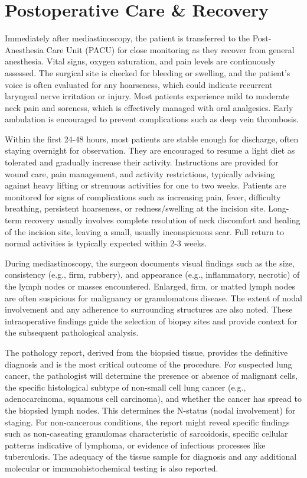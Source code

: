 \section*{Postoperative Care \& Recovery}
Immediately after mediastinoscopy, the patient is transferred to the Post-Anesthesia Care Unit (PACU) for close monitoring as they recover from general anesthesia. Vital signs, oxygen saturation, and pain levels are continuously assessed. The surgical site is checked for bleeding or swelling, and the patient's voice is often evaluated for any hoarseness, which could indicate recurrent laryngeal nerve irritation or injury. Most patients experience mild to moderate neck pain and soreness, which is effectively managed with oral analgesics. Early ambulation is encouraged to prevent complications such as deep vein thrombosis.

Within the first 24-48 hours, most patients are stable enough for discharge, often staying overnight for observation. They are encouraged to resume a light diet as tolerated and gradually increase their activity. Instructions are provided for wound care, pain management, and activity restrictions, typically advising against heavy lifting or strenuous activities for one to two weeks. Patients are monitored for signs of complications such as increasing pain, fever, difficulty breathing, persistent hoarseness, or redness/swelling at the incision site. Long-term recovery usually involves complete resolution of neck discomfort and healing of the incision site, leaving a small, usually inconspicuous scar. Full return to normal activities is typically expected within 2-3 weeks.

During mediastinoscopy, the surgeon documents visual findings such as the size, consistency (e.g., firm, rubbery), and appearance (e.g., inflammatory, necrotic) of the lymph nodes or masses encountered. Enlarged, firm, or matted lymph nodes are often suspicious for malignancy or granulomatous disease. The extent of nodal involvement and any adherence to surrounding structures are also noted. These intraoperative findings guide the selection of biopsy sites and provide context for the subsequent pathological analysis.

The pathology report, derived from the biopsied tissue, provides the definitive diagnosis and is the most critical outcome of the procedure. For suspected lung cancer, the pathologist will determine the presence or absence of malignant cells, the specific histological subtype of non-small cell lung cancer (e.g., adenocarcinoma, squamous cell carcinoma), and whether the cancer has spread to the biopsied lymph nodes. This determines the N-status (nodal involvement) for staging. For non-cancerous conditions, the report might reveal specific findings such as non-caseating granulomas characteristic of sarcoidosis, specific cellular patterns indicative of lymphoma, or evidence of infectious processes like tuberculosis. The adequacy of the tissue sample for diagnosis and any additional molecular or immunohistochemical testing is also reported.

